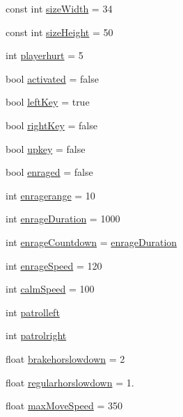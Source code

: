 \begin{DoxyCompactItemize}
\item 
const int \hyperlink{classPrincessObject_a47a9d5682110d021511d6295dd0e7f37}{size\+Width} = 34
\item 
const int \hyperlink{classPrincessObject_a39dc84acb78d1da527c8ca15dd1dff1f}{size\+Height} = 50
\item 
int \hyperlink{classPrincessObject_a1fd444137bd6b911d44c5159eeb99863}{playerhurt} = 5
\item 
bool \hyperlink{classPrincessObject_ab53915633585fac72d486a9f2186e290}{activated} = false
\item 
bool \hyperlink{classPrincessObject_ab25a8ac2a05a0519c9fe139fbce79d89}{left\+Key} = true
\item 
bool \hyperlink{classPrincessObject_a9023c2cc21ae3bb18772592adaeb774d}{right\+Key} = false
\item 
bool \hyperlink{classPrincessObject_ad9b1f2960b134b902515903b9a3b5a33}{upkey} = false
\item 
bool \hyperlink{classPrincessObject_a8fddc0f13abc747529e98638b9fd8e30}{enraged} = false
\item 
int \hyperlink{classPrincessObject_acd1ad7c77cb9769da19126c4cc73cc1e}{enragerange} = 10
\item 
int \hyperlink{classPrincessObject_a39922ad71fcd93967431da2b0675d098}{enrage\+Duration} = 1000
\item 
int \hyperlink{classPrincessObject_ac8ad96b2cf16eb3dea9e7e53437448c7}{enrage\+Countdown} = \hyperlink{classPrincessObject_a39922ad71fcd93967431da2b0675d098}{enrage\+Duration}
\item 
int \hyperlink{classPrincessObject_a7948a59cffd0f535af24b2888ad2853d}{enrage\+Speed} = 120
\item 
int \hyperlink{classPrincessObject_a8769f1732636d32b9d1cd6d9096016d8}{calm\+Speed} = 100
\item 
int \hyperlink{classPrincessObject_acd31f54e8a040a3fb3179cb016c7fd0f}{patrolleft}
\item 
int \hyperlink{classPrincessObject_a393424eb98d6c3f18409b828232b7da8}{patrolright}
\item 
float \hyperlink{classPrincessObject_a6966d0d9f1f4c59b19da87ddd0367584}{brakehorslowdown} = 2
\item 
float \hyperlink{classPrincessObject_a093c3d3c7b812fb303cd8472ee06e892}{regularhorslowdown} = 1.
\item 
float \hyperlink{classPrincessObject_ab1f55f314299965e494d518f1e429ac5}{max\+Move\+Speed} = 350

\end{DoxyCompactItemize}
